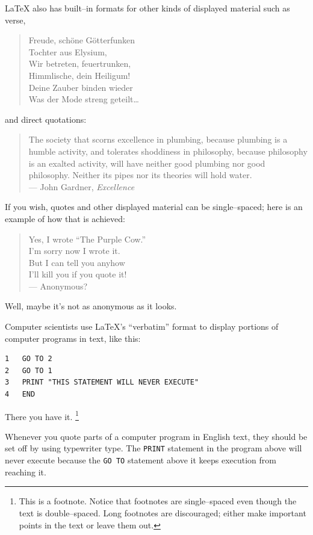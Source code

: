 \documentclass[12pt]{report}
\begin{document}
LaTeX also has built--in formats for other kinds of displayed material
such as verse,
\begin{verse}
Freude, sch\"{o}ne G\"{o}tterfunken  \\
Tochter aus Elysium,                 \\
Wir betreten, feuertrunken,          \\
Himmlische, dein Heiligum!          \\
Deine Zauber binden wieder            \\
Was der Mode streng geteilt\dots
\end{verse}
and direct quotations:
\begin{quote}
The society that scorns excellence in plumbing, because plumbing is a
humble activity, and tolerates shoddiness in philosophy, because
philosophy is an exalted activity, will have neither good plumbing nor
good philosophy.  Neither its pipes nor its theories will hold water.\\
\hspace*{\fill} --- John Gardner, {\em Excellence}
\end{quote}
If you wish, quotes and other displayed material can be single--spaced;
here is an example of how that is achieved:
\begin{verse}
\begin{singlespace}
Yes, I wrote ``The Purple Cow.'' \\
I'm sorry now I wrote it. \\
But I can tell you anyhow \\
I'll kill you if you quote it! \\
\hfill --- Anonymous?
\end{singlespace}
\end{verse}
Well, maybe it's not as anonymous as it looks.

Computer scientists use LaTeX's ``verbatim'' format to display portions
of computer programs in text, like this:
\begin{verbatim}
1   GO TO 2
2   GO TO 1
3   PRINT "THIS STATEMENT WILL NEVER EXECUTE"
4   END
\end{verbatim}
There you have it.%
\footnote{This is a footnote. Notice that footnotes are single--spaced
even though the text is double--spaced. Long footnotes are discouraged;
either make important points in the text or leave them out.}

Whenever you quote parts of a computer program in English text, they
should be set off by using typewriter type.  The \verb"PRINT" statement
in the program above will never execute because the \verb"GO TO"
statement above it keeps execution from reaching it.
\end{document}
